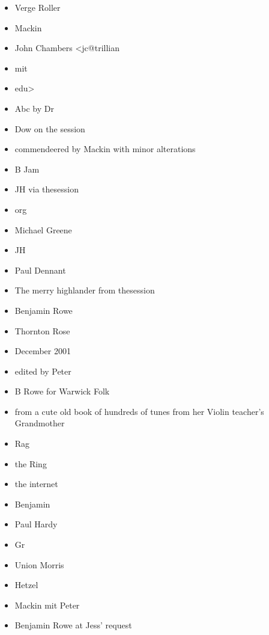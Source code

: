 \documentclass[12pt,a4paper,twoside]{article}
\begin{document}
\begin{multicols}{2}
\begin{itemize}\item Verge Roller
\item Mackin
\item John Chambers <jc@trillian
\item mit
\item edu>
\item Abc by Dr
\item Dow on the session
\item commendeered by Mackin with minor alterations
\item B Jam
\item JH via thesession
\item org
\item Michael Greene
\item JH
\item Paul Dennant
\item The merry highlander from thesession
\item Benjamin Rowe
\item Thornton Rose
\item December 2001
\item edited by Peter
\item B Rowe for Warwick Folk
\item from a cute old book of hundreds of tunes from her Violin teacher's Grandmother
\item Rag
\item the Ring
\item the internet
\item Benjamin
\item Paul Hardy
\item Gr
\item Union Morris
\item Hetzel
\item Mackin mit Peter
\item Benjamin Rowe at Jess' request
\end{itemize}

\end{multicols}

\newpage


\end{document}
